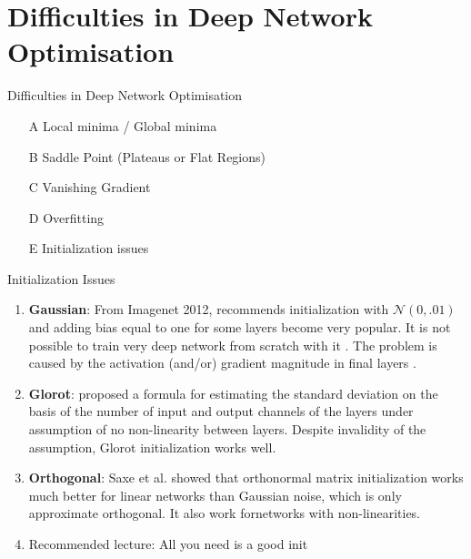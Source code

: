 \documentclass[xcolor=pdftex,dvipsnames,table,mathserif]{beamer}
\begin{document}



\section{Difficulties in Deep Network Optimisation}

\begin{frame}{Difficulties in Deep Network Optimisation}
\begin{itemize}
\item[A]{Local minima / Global minima}
\item[B]{Saddle Point (Plateaus or Flat Regions)}
\item[C]{Vanishing Gradient}
\item[D]{Overfitting}
\item[E]{Initialization issues}
\end{itemize}
\end{frame}





\begin{frame}{Initialization Issues}
\begin{enumerate}
\item \textbf{Gaussian}: From Imagenet 2012, \cite{krizhevsky2012imagenet} recommends initialization with $\mathcal{N}(0,.01)$ and adding bias equal to one
for some layers become very popular. It is not possible to train very deep network from scratch with it \cite{simonyan2014very}. The problem is caused by the
activation (and/or) gradient magnitude in final layers \cite{he2016deep}.
\item  \textbf{Glorot}:  \cite{glorot2010understanding}  proposed a formula for estimating the standard deviation on the basis of
the number of input and output channels of the layers under assumption of no non-linearity between
layers. Despite invalidity of the assumption, Glorot initialization works well.	
\item \textbf{Orthogonal}: Saxe et al. \cite{saxe2013exact}  showed that orthonormal matrix initialization works much better
for linear networks than Gaussian noise, which is only approximate orthogonal. It also work fornetworks with non-linearities.
\item Recommended lecture: All you need is a good init  \cite{mishkin2015all}
\end{enumerate}
\end{frame}
\end{document}
